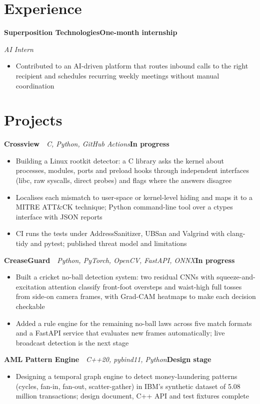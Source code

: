 \documentclass[10pt,a4paper]{article}
\newcommand{\entry}[2]{\textbf{#1}\hfill\textbf{#2}\par}
\newcommand{\role}[2]{\textit{#1}\hfill\textit{#2}\par}
\newcommand{\project}[3]{\textbf{#1}~\textbar~\textit{#2}\hfill\textbf{#3}\par}
\begin{document}
\section{Experience}
\entry{Superposition Technologies}{One-month internship}
\role{AI Intern}{}
\begin{itemize}
  \item Contributed to an AI-driven platform that routes inbound calls to the right recipient and schedules recurring weekly meetings without manual coordination
\end{itemize}

\section{Projects}
\project{Crossview}{C, Python, GitHub Actions}{In progress}
\begin{itemize}
  \item Building a Linux rootkit detector: a C library asks the kernel about processes, modules, ports and preload hooks through independent interfaces (libc, raw syscalls, direct probes) and flags where the answers disagree
  \item Localises each mismatch to user-space or kernel-level hiding and maps it to a MITRE ATT\&CK technique; Python command-line tool over a ctypes interface with JSON reports
  \item CI runs the tests under AddressSanitizer, UBSan and Valgrind with clang-tidy and pytest; published threat model and limitations
\end{itemize}
\vspace{2pt}
\project{CreaseGuard}{Python, PyTorch, OpenCV, FastAPI, ONNX}{In progress}
\begin{itemize}
  \item Built a cricket no-ball detection system: two residual CNNs with squeeze-and-excitation attention classify front-foot oversteps and waist-high full tosses from side-on camera frames, with Grad-CAM heatmaps to make each decision checkable
  \item Added a rule engine for the remaining no-ball laws across five match formats and a FastAPI service that evaluates new frames automatically; live broadcast detection is the next stage
\end{itemize}
\vspace{2pt}
\project{AML Pattern Engine}{C++20, pybind11, Python}{Design stage}
\begin{itemize}
  \item Designing a temporal graph engine to detect money-laundering patterns (cycles, fan-in, fan-out, scatter-gather) in IBM's synthetic dataset of 5.08 million transactions; design document, C++ API and test fixtures complete
\end{itemize}
\end{document}
